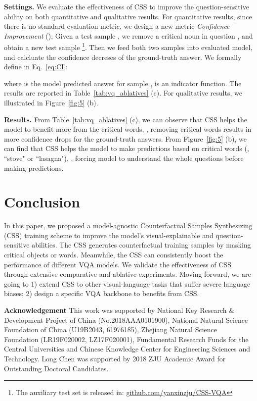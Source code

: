 \documentclass[10pt,twocolumn,letterpaper]{article}
\begin{document}
\noindent\textbf{Settings.} We evaluate the effectiveness of CSS to improve the question-sensitive ability on both quantitative and qualitative results. For quantitative results, since there is no standard evaluation metric, we design a new metric \emph{Confidence Improvement} (): Given a test sample , we remove a critical noun in question , and obtain a new test sample \footnote{The auxiliary test set is released in: \href{https://github.com/yanxinzju/CSS-VQA}{github.com/yanxinzju/CSS-VQA}}. Then we feed both two samples into evaluated model, and calcluate the confidence decreses of the ground-truth answer. We formally define  in Eq.~\ref{eq:CI}:

where  is the model predicted answer for sample ,  is an indicator function. The results are reported in Table~\ref{tab:vq_ablatives} (c). For qualitative results, we illustrated in Figure~\ref{fig:5} (b).

\noindent\textbf{Results.} From Table~\ref{tab:vq_ablatives} (c), we can observe that CSS helps the model to benefit more from the critical words, \ie, removing critical words results in more confidence drops for the ground-truth answers. From Figure~\ref{fig:5} (b), we can find that CSS helps the model to make predictions based on critical words (\eg, ``stove" or ``lasagna"), \ie, forcing model to understand the whole questions before making predictions.


\section{Conclusion}
In this paper, we proposed a model-agnostic Counterfactual Samples Synthesizing (CSS) training scheme to improve the model's visual-explainable and question-sensitive abilities. The CSS generates counterfactual training samples by masking critical objects or words. Meanwhile, the CSS can consistently boost the performance of different VQA models. We validate the effectiveness of CSS through extensive comparative and ablative experiments. Moving forward, we are going to 1) extend CSS to other visual-language tasks that suffer severe language biases; 2) design a specific VQA backbone to benefits from CSS.

\footnotesize \noindent\textbf{Acknowledgement} This work was supported by National Key Research \& Development Project of China (No.2018AAA0101900), National Natural Science Foundation of China (U19B2043, 61976185), Zhejiang Natural Science Foundation (LR19F020002, LZ17F020001), Fundamental Research Funds for the Central Universities and Chinese Knowledge Center for Engineering Sciences and Technology. Long Chen was supported by 2018 ZJU Academic Award for Outstanding Doctoral Candidates.

{\small


}
\end{document}
